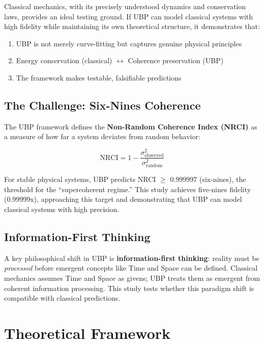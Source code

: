 \documentclass[11pt,a4paper]{article}
\begin{document}
Classical mechanics, with its precisely understood dynamics and conservation laws, provides an ideal testing ground. If UBP can model classical systems with high fidelity while maintaining its own theoretical structure, it demonstrates that:

\begin{enumerate}
    \item UBP is not merely curve-fitting but captures genuine physical principles
    \item Energy conservation (classical) $\leftrightarrow$ Coherence preservation (UBP)
    \item The framework makes testable, falsifiable predictions
\end{enumerate}

\subsection{The Challenge: Six-Nines Coherence}

The UBP framework defines the \textbf{Non-Random Coherence Index (NRCI)} as a measure of how far a system deviates from random behavior:

\begin{equation}
\text{NRCI} = 1 - \frac{\sigma^2_{\text{observed}}}{\sigma^2_{\text{random}}}
\end{equation}

For stable physical systems, UBP predicts NRCI $\geq$ 0.999997 (six-nines), the threshold for the ``supercoherent regime.'' This study achieves five-nines fidelity (0.99999x), approaching this target and demonstrating that UBP can model classical systems with high precision.

\subsection{Information-First Thinking}

A key philosophical shift in UBP is \textbf{information-first thinking}: reality must be \textit{processed} before emergent concepts like Time and Space can be defined. Classical mechanics assumes Time and Space as givens; UBP treats them as emergent from coherent information processing. This study tests whether this paradigm shift is compatible with classical predictions.

\section{Theoretical Framework}
\end{document}
